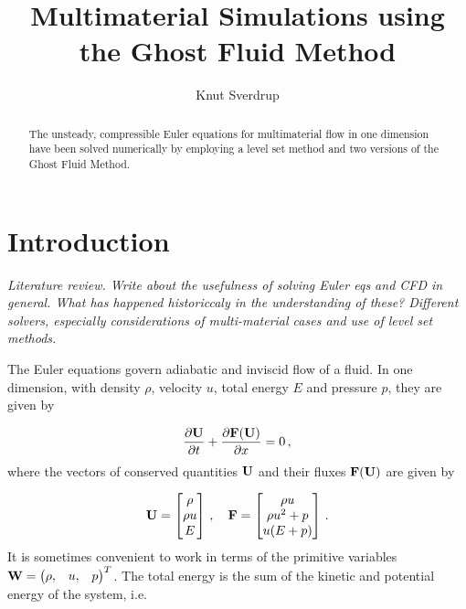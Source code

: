 \documentclass[final,3p,twocolumn]{elsarticle}
\begin{document}
\begin{frontmatter}

\title{Multimaterial Simulations using the Ghost Fluid Method}

\author{Knut Sverdrup}

\address{Cavendish Laboratory, Department of Physics, J J Thomson
  Avenue, Cambridge. CB3 0HE}

\begin{abstract}
    The unsteady, compressible Euler equations for multimaterial flow in one
    dimension have been solved numerically by employing a level set method and
    two versions of the Ghost Fluid Method. 
\end{abstract}

\end{frontmatter}

\section{Introduction}
\label{sec:introduction}

\emph{Literature review. Write about the usefulness of solving Euler eqs and
    CFD in general.  What has happened historiccaly in the understanding of
    these? Different solvers, especially considerations of multi-material cases
    and use of level set methods. }

The Euler equations govern adiabatic and inviscid flow of a fluid. In one
dimension, with density $\rho$, velocity $u$, total energy $E$ and pressure
$p$, they are given by 

\begin{equation}
    \frac{\partial {\bf U}}{\partial t} 
    + \frac{\partial {\bf F(U)}}{\partial x} = 0\,,
    \label{eq:euler}
\end{equation}
%
where the vectors of conserved quantities ${\bf U}$ and their fluxes ${\bf F(U)}$ are given by

\begin{equation*}
    {\bf U} = 
    \begin{bmatrix} 
        \rho \\ 
        \rho u \\ 
        E 
    \end{bmatrix}
    \,,\quad
    {\bf F} = 
    \begin{bmatrix}
        \rho u \\ 
        \rho u^2 + p \\
        u(E+p) 
    \end{bmatrix}
    \,.
\end{equation*}
%
It is sometimes convenient to work in terms of the primitive variables ${\bf W} =
\begin{pmatrix} \rho, & u, & p \end{pmatrix}^T$. The total energy is the sum of
the kinetic and potential energy of the system, i.e.~ 
\end{document}
